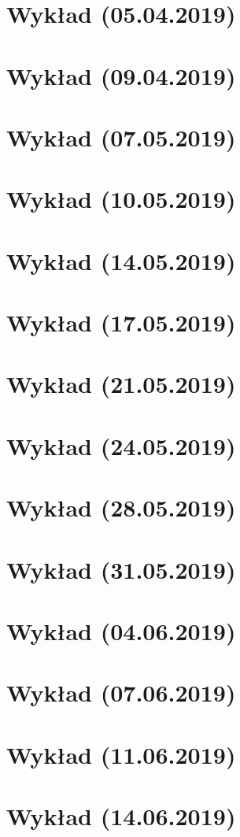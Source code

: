 \documentclass{article}
\begin{document}
\section{Wykład (05.04.2019)}

\pagebreak
\section{Wykład (09.04.2019)}

\pagebreak
\section{Wykład (07.05.2019)}

\pagebreak
\section{Wykład (10.05.2019)}

\pagebreak
\section{Wykład (14.05.2019)}

\pagebreak
\section{Wykład (17.05.2019)}

\pagebreak
\section{Wykład (21.05.2019)}

\pagebreak
\section{Wykład (24.05.2019)}

\pagebreak
\section{Wykład (28.05.2019)}

\pagebreak
\section{Wykład (31.05.2019)}

\pagebreak
\section{Wykład (04.06.2019)}

\pagebreak
\section{Wykład (07.06.2019)}

\pagebreak
\section{Wykład (11.06.2019)}

\pagebreak
\section{Wykład (14.06.2019)}

\pagebreak
\end{document}
